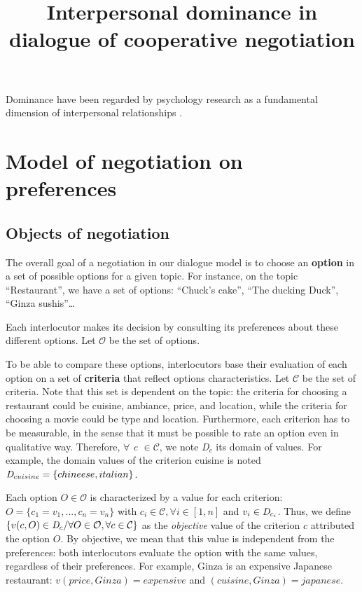 \documentclass{llncs}
\begin{document}
\title{ Interpersonal dominance in dialogue of cooperative negotiation}
\maketitle 

\par Dominance have been regarded by psychology research as a fundamental dimension of interpersonal relationships \cite{burgoon}. 

\section{Model of negotiation on preferences}
\subsection{Objects of negotiation}
\par The overall goal of a negotiation in our dialogue model is to choose an \textbf{option} in a set of possible options for a given topic. For instance, on the topic ``Restaurant'', we have a set of options: ``Chuck's cake'', ``The ducking Duck'', ``Ginza sushis''\ldots 
\par Each interlocutor makes its decision by consulting its preferences about these different options. Let $\mathcal{O}$ be the set of options.

To be able to compare these options, interlocutors base their evaluation of each option on a set of \textbf{criteria} that reflect options characteristics.
Let $\mathcal{C}$ be the set of criteria. 
Note that this set is dependent on the topic: the criteria for choosing a restaurant could be cuisine, ambiance, price, and location, while the criteria for choosing a movie could be type and location. 
Furthermore, each criterion has to be measurable, in the sense that it must be possible to rate an option even in qualitative way. Therefore, $\forall$ \emph{c $\in\mathcal{ C}$},  we note \emph{D$_c$} its  domain of values. For example, the domain  values of the criterion cuisine is noted $\emph{D}_{cuisine} = \{chineese, italian\}$.

Each option $O\in \mathcal{O}$ is characterized by a value for each criterion:
 $O = \{c_1=v_1,..., c_n=v_n\}$ with $c_i \in \mathcal{C}, \forall i \in [1,n]$ and $v_i\in \emph{D}_{c_i}$. 
 Thus, we define $\{v(c,O) \in \emph{D}_{c} / \forall O \in \mathcal{O}, \forall c \in \mathcal{C}\}$ as the \emph{objective} value of the criterion $c$ attributed  the option $O$. 
By objective, we mean that this value is independent from the preferences: both interlocutors evaluate the option with the same values, regardless of their preferences. 
For example, Ginza is an expensive Japanese restaurant: $v(price, Ginza) = expensive$ and $(cuisine, Ginza) = japanese$. 
\end{document}
